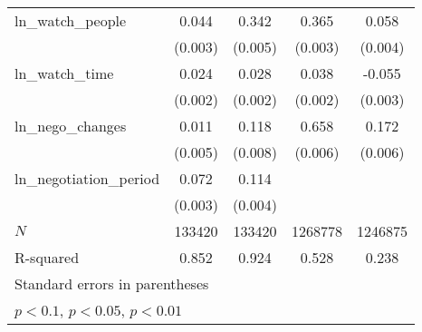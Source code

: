 {\begin{tabular}{l*{4}{c}}
ln\_watch\_people&       0.044\sym{***}&       0.342\sym{***}&       0.365\sym{***}&       0.058\sym{***}\\
            &     (0.003)         &     (0.005)         &     (0.003)         &     (0.004)         \\
\addlinespace
ln\_watch\_time&       0.024\sym{***}&       0.028\sym{***}&       0.038\sym{***}&      -0.055\sym{***}\\
            &     (0.002)         &     (0.002)         &     (0.002)         &     (0.003)         \\
\addlinespace
ln\_nego\_changes&       0.011\sym{**} &       0.118\sym{***}&       0.658\sym{***}&       0.172\sym{***}\\
            &     (0.005)         &     (0.008)         &     (0.006)         &     (0.006)         \\
\addlinespace
ln\_negotiation\_period&       0.072\sym{***}&       0.114\sym{***}&                     &                     \\
            &     (0.003)         &     (0.004)         &                     &                     \\
\midrule
\(N\)       &      133420         &      133420         &     1268778         &     1246875         \\
R-squared   &       0.852         &       0.924         &       0.528         &       0.238         \\
\bottomrule
\multicolumn{5}{l}{\footnotesize Standard errors in parentheses}\\
\multicolumn{5}{l}{\footnotesize \sym{*} \(p<0.1\), \sym{**} \(p<0.05\), \sym{***} \(p<0.01\)}\\
\end{tabular}
}
